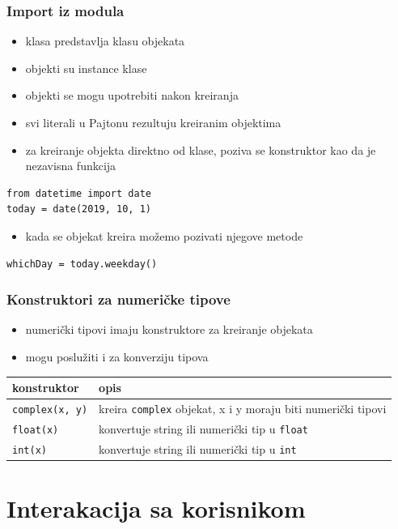 \documentclass[compress]{beamer}
\begin{document}
\begin{frame}[fragile]
\frametitle{Import iz modula}
\begin{itemize}
  \item klasa predstavlja klasu objekata
  \item objekti su instance klase
  \item objekti se mogu upotrebiti nakon kreiranja
  \item svi literali u Pajtonu rezultuju kreiranim objektima
\end{itemize}
\begin{itemize}
  \item za kreiranje objekta direktno od klase, poziva se konstruktor kao da je nezavisna funkcija
\end{itemize}
\begin{verbatim}
from datetime import date
today = date(2019, 10, 1)
\end{verbatim}
\begin{itemize}
  \item kada se objekat kreira možemo pozivati njegove metode
\end{itemize}
\begin{verbatim}
whichDay = today.weekday()
\end{verbatim}
\end{frame}

\begin{frame}[fragile]
\frametitle{Konstruktori za numeričke tipove}
\begin{itemize}
  \item numerički tipovi imaju konstruktore za kreiranje objekata
  \item mogu poslužiti i za konverziju tipova
\end{itemize}
\begin{tabular}{lp{7cm}}
  \textbf{konstruktor} & \textbf{opis} \\ \hline
  \texttt{complex(x, y)} & kreira \texttt{complex} objekat, x i y moraju biti numerički tipovi \\ \hline
  \texttt{float(x)} & konvertuje string ili numerički tip u \texttt{float} \\ \hline
  \texttt{int(x)} & konvertuje string ili numerički tip u \texttt{int} \\ \hline
\end{tabular}
\end{frame}

\section[UI]{Interakacija sa korisnikom}
\end{document}
